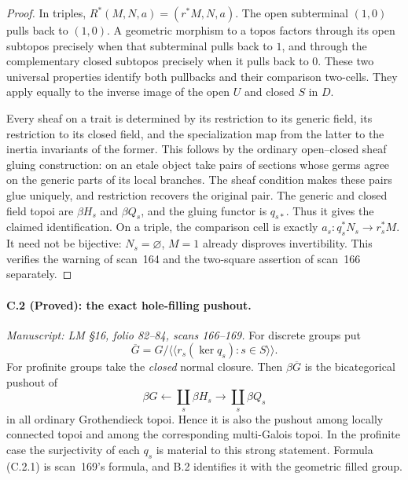 \begin{proof}
In triples, $R^*(M,N,a)=(r^*M,N,a)$. The open
subterminal $(1,0)$ pulls back to $(1,0)$. A geometric
morphism to a topos factors through its open subtopos
precisely when that subterminal pulls back to $1$, and
through the complementary closed subtopos precisely
when it pulls back to $0$. These two universal
properties identify both pullbacks and their comparison
two-cells. They apply equally to the inverse image of
the open $U$ and closed $S$ in $D$.

Every sheaf on a trait is determined by its restriction
to its generic field, its restriction to its closed
field, and the specialization map from the latter to
the inertia invariants of the former. This follows by
the ordinary open--closed sheaf gluing construction:
on an etale object take pairs of sections whose germs
agree on the generic parts of its local branches.
The sheaf condition makes these pairs glue uniquely,
and restriction recovers the original pair. The generic
and closed field topoi are $\beta H_s$ and $\beta Q_s$,
and the gluing functor is $q_{s*}$. Thus it gives the
claimed identification. On a triple, the comparison
cell is exactly $a_s:q_s^*N_s\to r_s^*M$. It need not be
bijective: $N_s=\varnothing$, $M=1$ already disproves
invertibility. This verifies the warning of scan~164
and the two-square assertion of scan~166 separately.
\end{proof}

\paragraph{C.2 (Proved): the exact hole-filling pushout.}\label{C2}
\textit{Manuscript: LM \S16, folio 82--84, scans 166--169.}
For discrete groups put
\[
 \overline G=G/\langle\!\langle r_s(\ker q_s):s\in S\rangle\!\rangle.
                                                               \tag{C.2.1}
\]
For profinite groups take the \emph{closed} normal closure.
Then $\beta\overline G$ is the bicategorical pushout of
\[
 \beta G\longleftarrow\coprod_s\beta H_s
                    \longrightarrow\coprod_s\beta Q_s          \tag{C.2.2}
\]
in all ordinary Grothendieck topoi. Hence it is also the
pushout among locally connected topoi and among the
corresponding multi-Galois topoi. In the profinite case
the surjectivity of each $q_s$ is material to this
strong statement. Formula (C.2.1) is scan~169's formula,
and B.2 identifies it with the geometric filled group.

